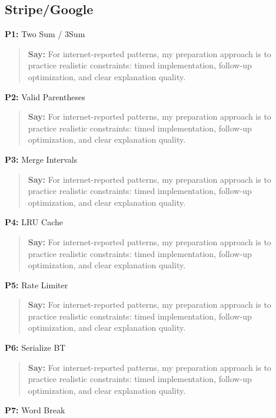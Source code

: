 \documentclass[9pt,a4paper]{article}
\begin{document}
\subsection{Stripe/Google}
\textbf{P1:} Two Sum / 3Sum

\begin{quote}\small\textbf{Say:} For internet-reported patterns, my preparation approach is to practice realistic constraints: timed implementation, follow-up optimization, and clear explanation quality.\end{quote}
\vspace{2mm}
\textbf{P2:} Valid Parentheses

\begin{quote}\small\textbf{Say:} For internet-reported patterns, my preparation approach is to practice realistic constraints: timed implementation, follow-up optimization, and clear explanation quality.\end{quote}
\vspace{2mm}
\textbf{P3:} Merge Intervals

\begin{quote}\small\textbf{Say:} For internet-reported patterns, my preparation approach is to practice realistic constraints: timed implementation, follow-up optimization, and clear explanation quality.\end{quote}
\vspace{2mm}
\textbf{P4:} LRU Cache

\begin{quote}\small\textbf{Say:} For internet-reported patterns, my preparation approach is to practice realistic constraints: timed implementation, follow-up optimization, and clear explanation quality.\end{quote}
\vspace{2mm}
\textbf{P5:} Rate Limiter

\begin{quote}\small\textbf{Say:} For internet-reported patterns, my preparation approach is to practice realistic constraints: timed implementation, follow-up optimization, and clear explanation quality.\end{quote}
\vspace{2mm}
\textbf{P6:} Serialize BT

\begin{quote}\small\textbf{Say:} For internet-reported patterns, my preparation approach is to practice realistic constraints: timed implementation, follow-up optimization, and clear explanation quality.\end{quote}
\vspace{2mm}
\textbf{P7:} Word Break
\end{document}
